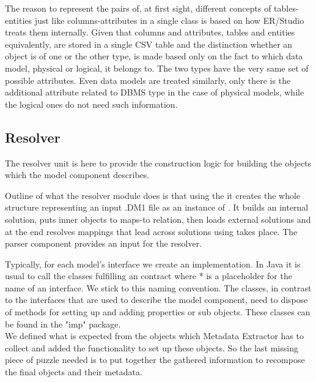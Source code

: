 The reason to represent the pairs of, at first sight, different concepts of tables-entities just like columns-attributes in a single class is based on how ER/Studio treats them internally. Given that columns and attributes, tables and entities equivalently, are stored in a single CSV table and the distinction whether an object is of one or the other type, is made based only on the fact to which data model, physical or logical, it belongs to.
The two types have the very same set of possible attributes. 
Even data models are treated similarly, only there is the additional attribute related to DBMS type in the case of physical models, while the logical ones do not need such information.

\subsection{Resolver}

The resolver unit is here to provide the construction logic for building the objects which the model component describes.

Outline of what the resolver module does is that using the  it creates the whole structure representing an input .DM1 file as an instance of . 
It builds an internal solution, puts inner objects to maps-to relation, then loads external solutions and at the end resolves mappings that lead across solutions using  takes place.
The parser component provides an input for the resolver.

Typically, for each model's interface we create an implementation. 
In Java it is usual to call the classes fulfilling an contract  where * is a placeholder for the name of an interface. We stick to this naming convention. 
The  classes, in contrast to the interfaces that are used to describe the model component, need to dispose of methods for setting up and adding properties or sub objects. These classes can be found in the "imp" package. \\

We defined what is expected from the objects which Metadata Extractor has to collect and added the functionality to set up these objects.
So the last missing piece of puzzle needed is to put together the gathered information to recompose the final objects and their metadata.

